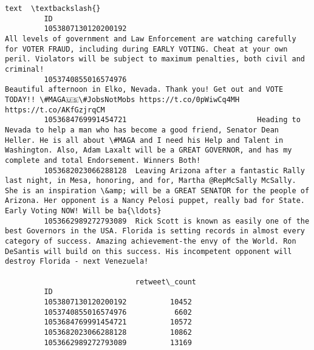 \documentclass[11pt]{article}
\begin{document}
\begin{Verbatim}[commandchars=\\\{\}]
                                                                                                                                                                                                                                                                                                                 text  \textbackslash{}
         ID                                                                                                                                                                                                                                                                                                             
         1053807130120200192                                                                    All levels of government and Law Enforcement are watching carefully for VOTER FRAUD, including during EARLY VOTING. Cheat at your own peril. Violators will be subject to maximum penalties, both civil and criminal!   
         1053740855016574976                                                                                                                                             Beautiful afternoon in Elko, Nevada. Thank you! Get out and VOTE TODAY!! \#MAGA🇺🇸\#JobsNotMobs https://t.co/0pWiwCq4MH https://t.co/AKfGzjrqCM   
         1053684769991454721                              Heading to Nevada to help a man who has become a good friend, Senator Dean Heller. He is all about \#MAGA and I need his Help and Talent in Washington. Also, Adam Laxalt will be a GREAT GOVERNOR, and has my complete and total Endorsement. Winners Both!   
         1053682023066288128  Leaving Arizona after a fantastic Rally last night, in Mesa, honoring, and for, Martha @RepMcSally McSally. She is an inspiration \&amp; will be a GREAT SENATOR for the people of Arizona. Her opponent is a Nancy Pelosi puppet, really bad for State. Early Voting NOW! Will be ba{\ldots}   
         1053662989272793089  Rick Scott is known as easily one of the best Governors in the USA. Florida is setting records in almost every category of success. Amazing achievement-the envy of the World. Ron DeSantis will build on this success. His incompetent opponent will destroy Florida - next Venezuela!   
         
                              retweet\_count  
         ID                                  
         1053807130120200192          10452  
         1053740855016574976           6602  
         1053684769991454721          10572  
         1053682023066288128          10862  
         1053662989272793089          13169  
\end{Verbatim}
            
\end{document}
